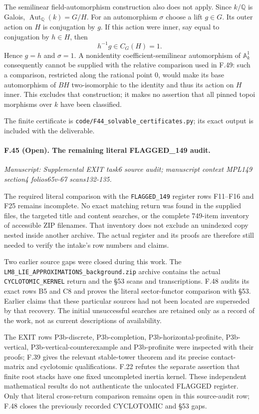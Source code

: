 The semilinear field-automorphism construction also does not apply.
Since $k/\mathbb Q$ is Galois,
$\operatorname{Aut}_{\mathbb Q}(k)=G/H$. For an automorphism
$\sigma$ choose a lift $g\in G$. Its outer action on $H$ is
conjugation by $g$. If this action were inner, say equal to
conjugation by $h\in H$, then
\[
                       h^{-1}g\in C_G(H)=1.
\]
Hence $g=h$ and $\sigma=1$. A nonidentity coefficient-semilinear
automorphism of $\mathbb A^1_k$ consequently cannot be supplied with
the relative comparison used in F.49: such a comparison, restricted
along the rational point $0$, would make its base automorphism of
$BH$ two-isomorphic to the identity and thus its action on $H$
inner. This excludes that construction; it makes no assertion that
all pinned topoi morphisms over $k$ have been classified.

The finite certificate is
\texttt{code/F44\_solvable\_certificates.py}; its exact output is
included with the deliverable.


\paragraph{F.45 (Open). The remaining literal FLAGGED\_149 audit.}
\textit{Manuscript: Supplemental EXIT task6 source audit; manuscript context MPL149 section4 folios65v-67 scans132-135.}

The required literal comparison with the \texttt{FLAGGED\_149}
register rows F11--F16 and F25 remains incomplete. No exact matching
return was found in the supplied files, the targeted title and content
searches, or the complete 749-item inventory of accessible ZIP
filenames. That inventory does not exclude an unindexed copy nested
inside another archive. The actual register and its proofs are
therefore still needed to verify the intake's row numbers and claims.

Two earlier source gaps were closed during this work. The
\texttt{LM8\_LIE\_APPROXIMATIONS\_background.zip} archive contains
the actual \texttt{CYCLOTOMIC\_KERNEL} return and the \S53 scans and
transcriptions. F.48 audits its exact rows B5 and C8 and proves the
literal sector-functor comparison with \S53. Earlier claims that
these particular sources had not been located are superseded by
that recovery. The initial unsuccessful searches are retained only
as a record of the work, not as current descriptions of availability.

The EXIT rows P3b-discrete, P3b-completion,
P3b-horizontal-profinite, P3b-vertical,
P3b-vertical-counterexample and P3b-profinite were inspected with
their proofs; F.39 gives the relevant stable-tower theorem and its
precise contact-matrix and cyclotomic qualifications. F.22 refutes
the separate assertion that finite root stacks have one fixed
uncompleted inertia kernel. These independent mathematical results
do not authenticate the unlocated FLAGGED register. Only that
literal cross-return comparison remains open in this source-audit
row; F.48 closes the previously recorded CYCLOTOMIC and \S53 gaps.


